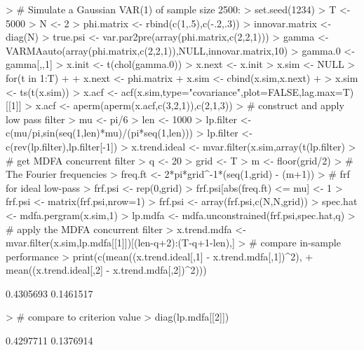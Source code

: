 \documentclass[a4paper]{book}
\begin{document}
\begin{Schunk}
\begin{Sinput}
> # Simulate a Gaussian VAR(1) of sample size 2500:
> set.seed(1234)
> T <- 5000
> N <- 2
> phi.matrix <- rbind(c(1,.5),c(-.2,.3))
> innovar.matrix <- diag(N)
> true.psi <- var.par2pre(array(phi.matrix,c(2,2,1)))
> gamma <- VARMAauto(array(phi.matrix,c(2,2,1)),NULL,innovar.matrix,10)
> gamma.0 <- gamma[,,1]
> x.init <- t(chol(gamma.0)) %
> x.next <- x.init
> x.sim <- NULL
> for(t in 1:T)
+ {
+ 	x.next <- phi.matrix %
+ 	x.sim <- cbind(x.sim,x.next)
+ }
> x.sim <- ts(t(x.sim))
> x.acf <- acf(x.sim,type="covariance",plot=FALSE,lag.max=T)[[1]]
> x.acf <- aperm(aperm(x.acf,c(3,2,1)),c(2,1,3))
> # construct and apply low pass filter
> mu <- pi/6
> len <- 1000
> lp.filter <- c(mu/pi,sin(seq(1,len)*mu)/(pi*seq(1,len)))
> lp.filter <- c(rev(lp.filter),lp.filter[-1])
> x.trend.ideal <- mvar.filter(x.sim,array(t(lp.filter) %
> # get MDFA concurrent filter
> q <- 20
> grid <- T
> m <- floor(grid/2)
> # The Fourier frequencies
> freq.ft <- 2*pi*grid^{-1}*(seq(1,grid) - (m+1))
> # frf for ideal low-pass
> frf.psi <- rep(0,grid)
> frf.psi[abs(freq.ft) <= mu] <- 1
> frf.psi <- matrix(frf.psi,nrow=1) %
> frf.psi <- array(frf.psi,c(N,N,grid))
> spec.hat <- mdfa.pergram(x.sim,1)	
> lp.mdfa <- mdfa.unconstrained(frf.psi,spec.hat,q)
> # apply the MDFA concurrent filter
> x.trend.mdfa <- mvar.filter(x.sim,lp.mdfa[[1]])[(len-q+2):(T-q+1-len),]
> # compare in-sample performance
> print(c(mean((x.trend.ideal[,1] - x.trend.mdfa[,1])^2),
+ 	mean((x.trend.ideal[,2] - x.trend.mdfa[,2])^2)))
\end{Sinput}
\begin{Soutput}
[1] 0.4305693 0.1461517
\end{Soutput}
\begin{Sinput}
> # compare to criterion value
> diag(lp.mdfa[[2]])
\end{Sinput}
\begin{Soutput}
[1] 0.4297711 0.1376914
\end{Soutput}
\end{Schunk}
\end{document}
